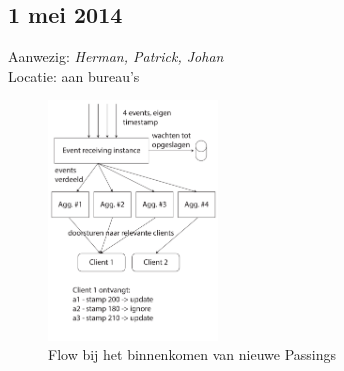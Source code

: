 \subsection*{1 mei 2014}
\label{sec:meeting-1-mei}

Aanwezig: \textit{Herman, Patrick, Johan}\\
Locatie: aan bureau's

\begin{figure}
\centering
\includegraphics[width=0.4\textwidth]{style/images/meeting1mei}
\caption{Flow bij het binnenkomen van nieuwe Passings}
\label{fig:not1mei}
\end{figure}

